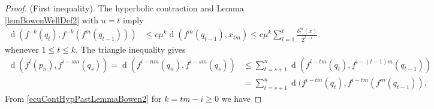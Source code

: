 \documentclass[12pt]{amsart}
\theoremstyle{plain}
\theoremstyle{definition}
\theoremstyle{remark}
\DeclareMathOperator{\dist}{d}
\begin{document}
\begin{proof}
	(First inequality). The hyperbolic contraction and Lemma \ref{lemBowenWellDef2} with $u=t$ imply
	\begin{equation}
		\label{ecuContHypPastLemmaBowen2}
		\begin{array}{rl}
			\dist(f^{-k}(q_t),f^{-k}(f^m(q_{t-1})))
			& \displaystyle\leq
			c\mu^k\dist(f^m(q_{t-1}),x_{tm})
			\leq c\mu^k
			\sum_{l=1}^t\frac{\delta_l^m(x)}{2^{t-l}}.
		\end{array}
	\end{equation}
	whenever $1\leq t\leq k$.
	The triangle inequality gives
	\begin{align*}
		\dist(f^i(p_n),f^{i-sm}(q_s))
		= \dist(f^{i-nm}(q_n),f^{i-sm}(q_s))
		&\leq \sum_{t=s+1}^n\dist(f^{i-tm}(q_t),f^{i-(t-1)m}(q_{t-1}))\\
		& = \sum_{t=s+1}^n\dist(f^{i-tm}(q_t),f^{i-tm}(f^m(q_{t-1})).
	\end{align*}
	From \eqref{ecuContHypPastLemmaBowen2} for  $k=tm-i\geq 0$ we have


\end{proof}
\end{document}
